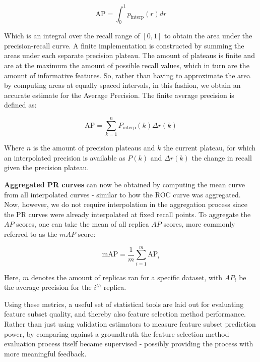\documentclass{article}
\begin{document}
\begin{equation}
\mathrm{AP} = \int_{0}^{1} p_{\text{interp}}(r) d r
\end{equation}

Which is an integral over the recall range of $[0, 1]$ to obtain the area under the precision-recall curve. A finite implementation is constructed by summing the areas under each separate precision plateau. The amount of plateaus is finite and are at the maximum the amount of possible recall values, which in turn are the amount of informative features. So, rather than having to approximate the area by computing areas at equally spaced intervals, in this fashion, we obtain an accurate estimate for the Average Precision. The finite average precision is defined as:

\begin{equation}
\mathrm{AP}=\sum_{k=1}^{n} P_{\text{interp}}(k) \Delta r(k)
\end{equation}

Where $n$ is the amount of precision plateaus and $k$ the current plateau, for which an interpolated precision is available as $P(k)$ and $\Delta r(k)$ the change in recall given the precision plateau.

\textbf{Aggregated PR curves} can now be obtained by computing the mean curve from all interpolated curves - similar to how the ROC curve was aggregated. Now, however, we do not require interpolation in the aggregation process since the PR curves were already interpolated at fixed recall points. To aggregate the $AP$ scores, one can take the mean of all replica $AP$ scores, more commonly referred to as the \textbf{$mAP$} score:

\begin{equation}
\mathrm{mAP}=\frac{1}{m} \sum_{i=1}^{m} \mathrm{AP}_{i}
\end{equation}

Here, $m$ denotes the amount of replicas ran for a specific dataset, with $AP_i$ be the average precision for the $i^{th}$ replica.

Using these metrics, a useful set of statistical tools are laid out for evaluating feature subset quality, and thereby also feature selection method performance. Rather than just using validation estimators to measure feature subset prediction power, by comparing against a groundtruth the feature selection method evaluation process itself became supervised - possibly providing the process with more meaningful feedback.
\end{document}
